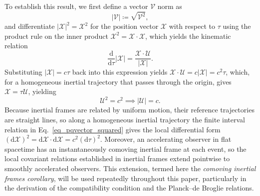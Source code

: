 To establish this result, we first define a vector $\boldsymbol{\mathcal{V}}$ norm as
\begin{equation}
    |\boldsymbol{\mathcal{V}}| \coloneqq \sqrt{\boldsymbol{\mathcal{V}}^{2}},
\end{equation}
and differentiate $|\boldsymbol{\mathcal{X}}|^{2} = \boldsymbol{\mathcal{X}}^{2}$ for the position vector $\boldsymbol{\mathcal{X}}$ with respect to $\tau$ using the product rule on the inner product $\boldsymbol{\mathcal{X}}^{2} = \boldsymbol{\mathcal{X}} \cdot \boldsymbol{\mathcal{X}}$, which yields the kinematic relation
\begin{equation}
    \frac{\mathrm{d}}{\mathrm{d}\tau}|\boldsymbol{\mathcal{X}}| = \frac{\boldsymbol{\mathcal{X}} \cdot \boldsymbol{\mathcal{U}}}{|\boldsymbol{\mathcal{X}}|}.
\end{equation}
Substituting $|\boldsymbol{\mathcal{X}}| = c\tau$ back into this expression yields $\boldsymbol{\mathcal{X}} \cdot \boldsymbol{\mathcal{U}} = c |\boldsymbol{\mathcal{X}}| = c^{2}\tau$, which, for a homogeneous inertial trajectory that passes through the origin, gives $\boldsymbol{\mathcal{X}} = \tau \boldsymbol{\mathcal{U}}$, yielding
\begin{equation}\label{eq_squared_pqvelocity_norm}
    \boldsymbol{\mathcal{U}}^{2} = c^{2} \implies |\boldsymbol{\mathcal{U}}| = c.
\end{equation}
Because inertial frames are related by uniform motion, their reference trajectories are straight lines, so along a homogeneous inertial trajectory the finite interval relation in Eq.~\eqref{eq_pqvector_squared} gives the local differential form $(\mathrm{d}\boldsymbol{\mathcal{X}})^{2}=\mathrm{d}\boldsymbol{\mathcal{X}}\cdot\mathrm{d}\boldsymbol{\mathcal{X}}=c^{2}(\mathrm{d}\tau)^{2}$. Moreover, an accelerating observer in flat spacetime has an instantaneously comoving inertial frame at each event, so the local covariant relations established in inertial frames extend pointwise to smoothly accelerated observers. This extension, termed here the \emph{comoving inertial frames corollary}, will be used repeatedly throughout this paper, particularly in the derivation of the compatibility condition and the Planck--de Broglie relations.
